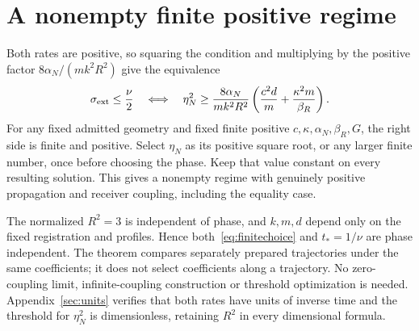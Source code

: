 \section{A nonempty finite positive regime}\label{sec:regime}
Both rates are positive, so squaring the condition and multiplying by the positive factor $8\alpha_N/(mk^2R^2)$ give the equivalence
\begin{equation}\label{eq:finitechoice}%
\sigma_{\rm ext}\le\frac\nu2
\quad\Longleftrightarrow\quad
\eta_N^2\ge
\frac{8\alpha_N}{mk^2R^2}
\left(\frac{c^2d}{m}+\frac{\kappa^2m}{\beta_R}\right).
\end{equation}
For any fixed admitted geometry and fixed finite positive $c,\kappa,\alpha_N,\beta_R,G$, the right side is finite and positive. Select $\eta_N$ as its positive square root, or any larger finite number, once before choosing the phase. Keep that value constant on every resulting solution. This gives a nonempty regime with genuinely positive propagation and receiver coupling, including the equality case.

The normalized $R^2=3$ is independent of phase, and $k,m,d$ depend only on the fixed registration and profiles. Hence both~\eqref{eq:finitechoice} and $t_*=1/\nu$ are phase independent. The theorem compares separately prepared trajectories under the same coefficients; it does not select coefficients along a trajectory. No zero-coupling limit, infinite-coupling construction or threshold optimization is needed. Appendix~\ref{sec:units} verifies that both rates have units of inverse time and the threshold for $\eta_N^2$ is dimensionless, retaining $R^2$ in every dimensional formula.
